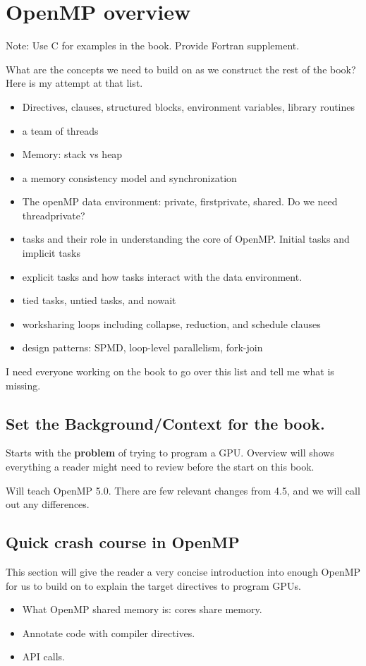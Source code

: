 
\def\ArtDir{02.Overview/figures}%

\chapter[OpenMP overview]{OpenMP overview}
\label{chapter:overview}

Note: Use C for examples in the book. Provide Fortran supplement.

What are the concepts we need to build on as we construct the rest of the book?  Here is my attempt at that list.  
\begin{itemize}
\item Directives, clauses, structured blocks, environment variables, library routines
\item a team of threads
\item Memory: stack vs heap
\item a memory consistency model and synchronization
\item The openMP data environment: private, firstprivate, shared.  Do we need threadprivate?
\item tasks and their role in understanding the core of OpenMP.  Initial tasks and implicit tasks
\item explicit tasks and how tasks interact with the data environment.
\item tied tasks, untied tasks, and nowait
\item worksharing loops including collapse, reduction, and schedule clauses
\item design patterns: SPMD, loop-level parallelism, fork-join
\end{itemize}
I need everyone working on the book to go over this list and tell me what is missing.


\section{Set the Background/Context for the book.}

Starts with the {\bf problem} of trying to program a GPU.
Overview will shows everything a reader might need to review before the start on this book.

Will teach OpenMP 5.0. There are few relevant changes from 4.5, and we will call out any differences.

\section{Quick crash course in OpenMP}
This section will give the reader a very concise introduction into enough OpenMP for us to build on to explain the target directives to program GPUs.
\begin{itemize}
  \item What OpenMP shared memory is: cores share memory.
  \item Annotate code with compiler directives.
  \item API calls.
\end{itemize}

